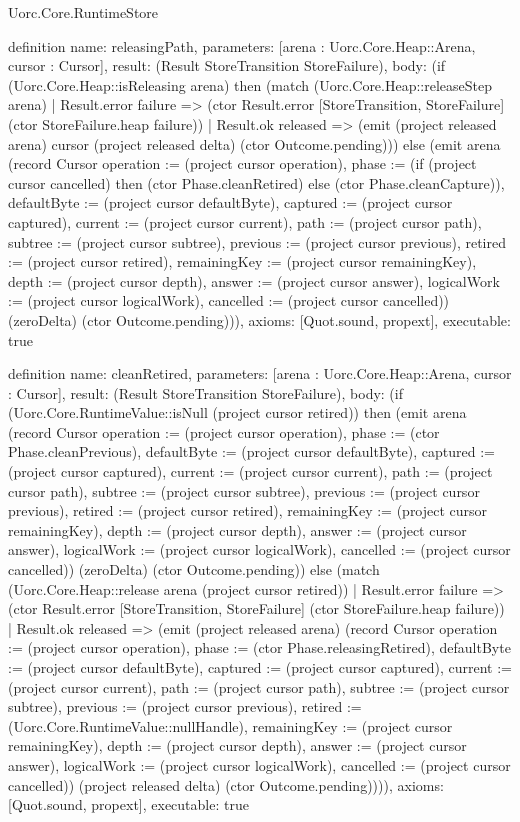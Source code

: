 \begin{lexlean}{Uorc.Core.RuntimeStore}
\begin{semanticmodule}
definition{
  name: releasingPath,
  parameters: [arena : Uorc.Core.Heap::Arena, cursor : Cursor],
  result: (Result StoreTransition StoreFailure),
  body: (if (Uorc.Core.Heap::isReleasing arena) then (match (Uorc.Core.Heap::releaseStep arena)
    | Result.error failure => (ctor Result.error [StoreTransition, StoreFailure] (ctor StoreFailure.heap failure))
    | Result.ok released => (emit (project released arena) cursor (project released delta) (ctor Outcome.pending))) else (emit arena (record Cursor {operation := (project cursor operation), phase := (if (project cursor cancelled) then (ctor Phase.cleanRetired) else (ctor Phase.cleanCapture)), defaultByte := (project cursor defaultByte), captured := (project cursor captured), current := (project cursor current), path := (project cursor path), subtree := (project cursor subtree), previous := (project cursor previous), retired := (project cursor retired), remainingKey := (project cursor remainingKey), depth := (project cursor depth), answer := (project cursor answer), logicalWork := (project cursor logicalWork), cancelled := (project cursor cancelled)}) (zeroDelta) (ctor Outcome.pending))),
  axioms: [Quot.sound, propext],
  executable: true
}

definition{
  name: cleanRetired,
  parameters: [arena : Uorc.Core.Heap::Arena, cursor : Cursor],
  result: (Result StoreTransition StoreFailure),
  body: (if (Uorc.Core.RuntimeValue::isNull (project cursor retired)) then (emit arena (record Cursor {operation := (project cursor operation), phase := (ctor Phase.cleanPrevious), defaultByte := (project cursor defaultByte), captured := (project cursor captured), current := (project cursor current), path := (project cursor path), subtree := (project cursor subtree), previous := (project cursor previous), retired := (project cursor retired), remainingKey := (project cursor remainingKey), depth := (project cursor depth), answer := (project cursor answer), logicalWork := (project cursor logicalWork), cancelled := (project cursor cancelled)}) (zeroDelta) (ctor Outcome.pending)) else (match (Uorc.Core.Heap::release arena (project cursor retired))
    | Result.error failure => (ctor Result.error [StoreTransition, StoreFailure] (ctor StoreFailure.heap failure))
    | Result.ok released => (emit (project released arena) (record Cursor {operation := (project cursor operation), phase := (ctor Phase.releasingRetired), defaultByte := (project cursor defaultByte), captured := (project cursor captured), current := (project cursor current), path := (project cursor path), subtree := (project cursor subtree), previous := (project cursor previous), retired := (Uorc.Core.RuntimeValue::nullHandle), remainingKey := (project cursor remainingKey), depth := (project cursor depth), answer := (project cursor answer), logicalWork := (project cursor logicalWork), cancelled := (project cursor cancelled)}) (project released delta) (ctor Outcome.pending)))),
  axioms: [Quot.sound, propext],
  executable: true
}


\end{semanticmodule}
\end{lexlean}

